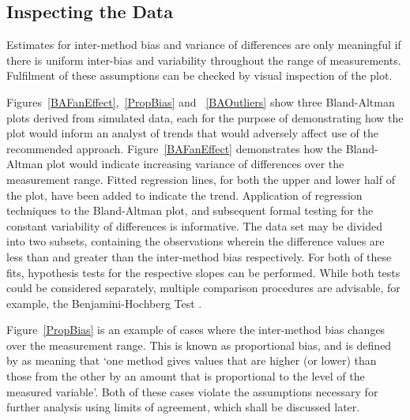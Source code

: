 \documentclass[12pt, a4paper]{report}
\theoremstyle{plain}
\theoremstyle{definition}
\theoremstyle{remark}
\begin{document}
	\subsection{Inspecting the Data}

Estimates for inter-method bias and variance of differences are only meaningful if there is uniform inter-bias and variability throughout the range of measurements. Fulfilment of these assumptions can be checked by visual inspection of the plot.

	
Figures~\ref{BAFanEffect},~\ref{PropBias} and ~\ref{BAOutliers} show three Bland-Altman plots derived from
	simulated data, each for the purpose of demonstrating how the plot would inform an analyst of trends that would adversely affect use of the recommended approach. Figure~\ref{BAFanEffect} demonstrates how the Bland-Altman plot would indicate
	increasing variance of differences over the measurement range.
	Fitted regression lines, for both the upper and lower half of the	plot, have been added to indicate the trend. Application of regression techniques to the Bland-Altman plot, and subsequent formal testing for the constant variability of differences is informative. The data set may be divided into two subsets, containing the observations wherein the difference values are less than and greater than the inter-method bias respectively. For both of these fits, hypothesis tests for the respective slopes can be performed. While both tests could be considered separately, multiple comparison procedures are advisable, for example, the Benjamini-Hochberg Test \citep{BH}.
	
Figure~\ref{PropBias} is an example
	of cases where the inter-method bias changes over the measurement range. This is known as proportional bias, and is defined by \citet{ludbrook97} as meaning that `one method gives
	values that are higher (or lower) than those from the other by an
	amount that is proportional to the level of the measured variable'. Both of these cases violate the assumptions necessary for further analysis using limits of agreement, which shall be discussed later. 
	
\end{document}
